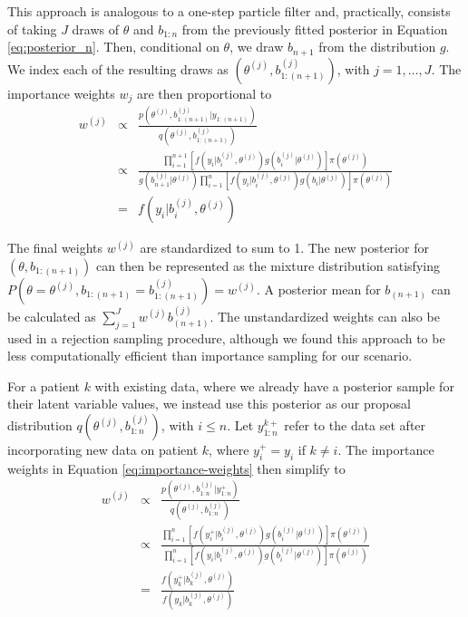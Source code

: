 \documentclass[12pt, letterpaper]{article}
\begin{document}
This approach is analogous to a one-step particle filter \cite{Bishop2006} and, practically, consists of taking $J$ draws of $\theta$ and $b_{1:n}$ from the previously fitted posterior in Equation \ref{eq:posterior_n}. Then, conditional on $\theta$, we draw $b_{n+1}$ from the distribution $g$. We index each of the resulting draws as $(\theta^{(j)},b_{1:(n+1)}^{(j)})$, with $j=1,\dots,J$. The importance weights $w_{j}$ are then proportional to 
\begin{eqnarray}
w^{(j)} & \propto & \frac{p(\theta^{(j)},b_{1:(n+1)}^{(j)}|y_{1:(n+1)})}{q(\theta^{(j)},b_{1:(n+1)}^{(j)})} \nonumber \\
 & \propto & \frac{\prod_{i=1}^{n+1}[f(y_{i}|b_{i}^{(j)},\theta^{(j)})g(b_{i}^{(j)}|\theta^{(j)})]\pi(\theta^{(j)})}{g(b_{n+1}^{(j)}|\theta^{(j)})\prod_{i=1}^{n}[f(y_{i}|b_{i}^{(j)},\theta^{(j)})g(b_{i}|\theta^{(j)})]\pi(\theta^{(j)})} \nonumber \\
\label{eq:importance-weights}
 & = & f(y_{i}|b_{i}^{(j)},\theta^{(j)})
\end{eqnarray}

The final weights $w^{(j)}$ are standardized to sum to 1. The new posterior for $(\theta,b_{1:(n+1)})$ can then be represented as the mixture distribution satisfying $P(\theta=\theta^{(j)},b_{1:(n+1)}=b_{1:(n+1)}^{(j)})=w^{(j)}$. A posterior mean for $b_{(n+1)}$ can be calculated as $\sum_{j=1}^{J}w^{(j)}b_{(n+1)}^{(j)}$. The unstandardized weights can also be used in a rejection sampling procedure, although we found this approach to be less computationally efficient than importance sampling for our scenario.


For a patient $k$ with existing data, where we already have a posterior sample for their latent variable values, we instead use this posterior as our proposal distribution $q(\theta^{(j)},b_{1:n}^{(j)})$, with $i\leq n$. Let $y_{1:n}^{k+}$ refer to the data set after incorporating new data on patient $k$, where $y_{i}^{+}=y_{i}$ if $k\neq i$. The importance weights in Equation \ref{eq:importance-weights} then simplify to
\begin{eqnarray*}
w^{(j)} & \propto & \frac{p(\theta^{(j)},b_{1:n}^{(j)}|y_{1:n}^{+})}{q(\theta^{(j)},b_{1:n}^{(j)})}\\
 & \propto & \frac{\prod_{i=1}^{n}[f(\ensuremath{y_{i}^{+}}|b_{i}^{(j)},\theta^{(j)})g(b_{i}^{(j)}|\theta^{(j)})]\pi(\theta^{(j)})}{\prod_{i=1}^{n}[f(\ensuremath{ y_{i} }|b_{i}^{(j)},\theta^{(j)})g(b_{i}^{(j)}|\theta^{(j)})]\pi(\theta^{(j)})}\\
 & = & \frac{f(\ensuremath{ y_{k}^{+}} |b_{ k }^{(j)},\theta^{(j)})}{f(\ensuremath{ y_{k}} |b_{k}^{(j)},\theta^{(j)})}
\end{eqnarray*}
\end{document}
